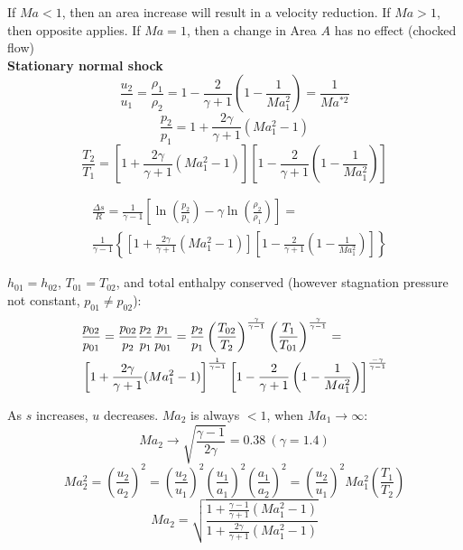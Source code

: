 \documentclass[8pt, landscape, fleqn]{scrartcl}
\begin{document}
\begin{multicols*}{3}
If $Ma < 1$, then an area increase will result in a velocity reduction. If $Ma > 1$, then opposite applies. If $Ma = 1$, then a change in Area $A$ has no effect (chocked flow) \\

\textbf{Stationary normal shock}
\begin{equation*}
    \frac{u_2}{u_1} = \frac{\rho_1}{\rho_2} = 1 - \frac{2}{\gamma+1} \left( 1- \frac{1}{Ma_1^2}\right) = \frac{1}{Ma^{*2}}
\end{equation*}
\begin{equation*}
    \frac{p_2}{p_1} = 1 + \frac{2 \gamma}{\gamma + 1} \left( Ma_1^2 - 1 \right)
\end{equation*}
\begin{equation*}
    \frac{T_2}{T_1} = \left[ 1 + \frac{2 \gamma}{\gamma + 1} \left( Ma_1^2 -1 \right) \right]\left[ 1-\frac{2}{\gamma+1} \left( 1-\frac{1}{Ma_1^2} \right) \right]
\end{equation*}

\begin{align*}
    &\frac{\Delta s}{R} = \frac{1}{\gamma-1} \left[ \ln \left( \frac{p_2}{p_1} \right) - \gamma \ln \left( \frac{\rho_2}{\rho_1}\right)\right] = \\
    & \frac{1}{\gamma-1}\left\{\left[ 1 + \frac{2\gamma}{\gamma+1}\left( Ma_1^2 -1 \right)\right] \left[ 1-\frac{2}{\gamma+1}\left(1-\frac{1}{Ma_1^2}\right)\right]\right\}
\end{align*}

$h_{01} = h_{02}$, $T_{01} = T_{02}$, and total enthalpy conserved (however stagnation pressure not constant, $p_{01}\neq p_{02}$):
\begin{align*}
    &\frac{p_{02}}{p_{01}} = \frac{p_{02}}{p_{2}} \frac{p_2}{p_1} \frac{p_1}{p_{01}} = \frac{p_2}{p_1} \left( \frac{T_{02}}{T_2} \right)^{\frac{\gamma}{\gamma-1}}\left(\frac{T_1}{T_{01}}\right)^{\frac{\gamma}{\gamma-1}} = \\
    & \left[ 1 + \frac{2 \gamma}{\gamma + 1} (Ma_1^2 -1)\right]^{\frac{\-1}{\gamma-1}} \left[1- \frac{2}{\gamma+1} \left( 1-\frac{1}{Ma_1^2}\right)\right]^{\frac{-\gamma}{\gamma-1}} 
\end{align*}

As $s$ increases, $u$ decreases. $Ma_2$ is always $<1$, when $Ma_1 \rightarrow \infty$:
\begin{equation*}
    Ma_2 \rightarrow \sqrt{\frac{\gamma-1}{2\gamma}} = 0.38 ~ (\gamma = 1.4)
\end{equation*}
\begin{equation*}
    Ma_2^2 = \left( \frac{u_2}{a_2}\right)^2 = \left( \frac{u_2}{u_1}\right)^2 \left( \frac{u_1}{a_1}\right)^2 \left( \frac{a_1}{a_2}\right)^2 = \left( \frac{u_2}{u_1}\right)^2 Ma_1^2 \left( \frac{T_1}{T_2}\right)
\end{equation*}
\begin{equation*}
    Ma_2 = \sqrt{\frac{1 + \frac{\gamma -1}{\gamma + 1} \left( Ma_1^2 -1\right)}{1 + \frac{2\gamma}{\gamma + 1}\left( Ma_1^2 - 1\right)}}
\end{equation*}


\end{multicols*}
\end{document}
